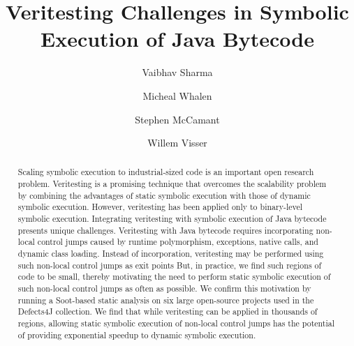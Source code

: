 \documentclass[sigconf]{acmart}
\begin{document}
\title{Veritesting Challenges in Symbolic Execution of Java Bytecode}
\author{Vaibhav Sharma}

\author{Micheal Whalen}

\author{Stephen McCamant}

\author{Willem Visser}
\renewcommand{\shortauthors}{V. Sharma et al.}


\begin{abstract}
Scaling symbolic execution to industrial-sized code is an important open research problem. 
%
Veritesting is a promising technique that overcomes the scalability problem by combining the advantages of static symbolic execution with those of dynamic symbolic execution.
%
However, veritesting has been applied only to binary-level symbolic execution.
%
Integrating veritesting with symbolic execution of Java bytecode presents unique challenges.
%
Veritesting with Java bytecode requires incorporating non-local control jumps caused by runtime polymorphism, exceptions, native calls, and dynamic class loading.
%
Instead of incorporation, veritesting may be performed using such non-local control jumps as exit points
%
But, in practice, we find such regions of code to be small, thereby motivating the need to perform static symbolic execution of such non-local control jumps as often as possible.
%
We confirm this motivation by running a Soot-based static analysis on six large open-source projects used in the Defects4J collection.
%
We find that while veritesting can be applied in thousands of regions, allowing static symbolic execution of non-local control jumps has the potential of providing exponential speedup to dynamic symbolic execution.
%
\end{abstract}
\end{document}
